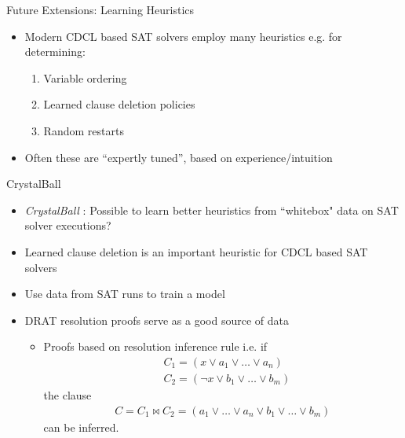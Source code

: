 \documentclass{beamer}
\begin{document}

\begin{frame}{Future Extensions: Learning Heuristics}
    \begin{itemize}
        \item Modern CDCL based SAT solvers employ many heuristics e.g. for determining:
            \begin{enumerate}
                \item Variable ordering
                \item Learned clause deletion policies
                \item Random restarts
            \end{enumerate}
        \pause
        \item Often these are ``expertly tuned'', based on experience/intuition
    \end{itemize}
\end{frame}

\begin{frame}{CrystalBall}
    \begin{itemize}[<+->]
        \item \textit{CrystalBall} \cite{2019sooscrystalball}: Possible to learn better heuristics from ``whitebox" data on SAT solver executions? 
        \item Learned clause deletion is an important heuristic for CDCL based SAT solvers
        \item Use data from SAT runs to train a model
        \item DRAT resolution proofs serve as a good source of data
        \pause
        \begin{itemize}
            \item Proofs based on resolution inference rule i.e. if
            \begin{align*}
                &C_1 = (x \vee a_1 \vee \dots \vee a_n) \\
                &C_2 = (\neg{x} \vee b_1 \vee \dots \vee b_m)
            \end{align*}
            the clause 
            \begin{align*}
                C = C_1 \bowtie C_2 = (a_1 \vee \dots \vee a_n \vee b_1 \vee \dots \vee b_m)
            \end{align*}
            can be inferred.
        \end{itemize}
    \end{itemize}
\end{frame}
\end{document}
